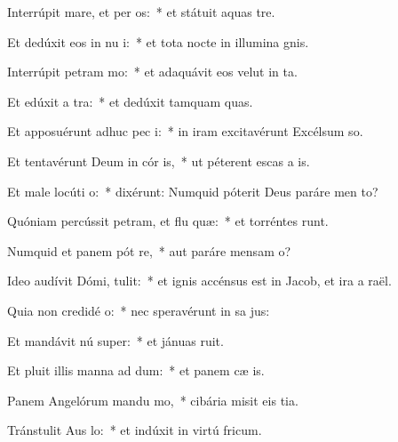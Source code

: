 \item Interrúpit mare, et per os:~* et státuit aquas   tre.
\item Et dedúxit eos in nu i:~* et tota nocte in illumina gnis.
\item Interrúpit petram  mo:~* et adaquávit eos velut in  ta.
\item Et edúxit a  tra:~* et dedúxit tamquam  quas.
\item Et apposuérunt adhuc pec i:~* in iram excitavérunt Excélsum  so.
\item Et tentavérunt Deum in cór is,~* ut péterent escas a is.
\item Et male locúti   o:~* dixérunt: Numquid póterit Deus paráre men  to?
\item Quóniam percússit petram, et flu quæ:~* et torréntes runt.
\item Numquid et panem pót re,~* aut paráre mensam  o?
\item Ideo audívit Dómi,  tulit:~* et ignis accénsus est in Jacob, et ira a  raël.
\item Quia non credidé  o:~* nec speravérunt in sa jus:
\item Et mandávit nú super:~* et jánuas  ruit.
\item Et pluit illis manna ad dum:~* et panem cæ  is.
\item Panem Angelórum mandu mo,~* cibária misit eis  tia.
\item Tránstulit Aus  lo:~* et indúxit in virtú  fricum.
